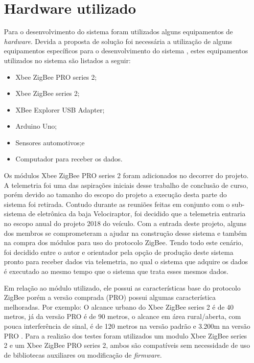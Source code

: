 \section{Hardware utilizado}
\label{sec:hardwareutilizado}

Para o desenvolvimento do sistema foram utilizados alguns equipamentos de \textit{hardware}. Devida a proposta de solução foi necessária a utilização de alguns equipamentos específicos para o desenvolvimento do sistema , estes equipamentos utilizados no sistema são listados a seguir:

\begin{itemize}
	\item Xbee ZigBee PRO series 2;
	\item Xbee ZigBee series 2;
	\item XBee Explorer USB Adapter;
	\item Arduino Uno;
	\item Sensores automotivos;e
	\item Computador para receber os dados. 
\end{itemize}  

Os módulos Xbee ZigBee PRO series 2 foram adicionados no decorrer do projeto. A telemetria foi uma das aspirações iniciais desse trabalho de conclusão de curso, porém devido ao tamanho do escopo do projeto a execução desta parte do sistema foi retirada. Contudo durante as reuniões feitas em conjunto com o sub-sistema de eletrônica da baja Velociraptor, foi decidido que a telemetria entraria no escopo anual do projeto 2018 do veículo. Com a entrada deste projeto, alguns dos membros se comprometeram a ajudar na construção desse sistema e também na compra dos módulos para uso do protocolo ZigBee. Tendo todo este cenário, foi decidido entre o autor e orientador pela opção de produção deste sistema pronto para receber dados via telemetria, no qual o sistema que adquire os dados é executado ao mesmo tempo que o sistema que trata esses mesmos dados. 

Em relação ao módulo utilizado, ele possui as características base do protocolo ZigBee porém a versão comprada (PRO) possui algumas característica melhoradas. Por exemplo: O alcance urbano do Xbee ZigBee series 2 é de 40 metros, já da versão PRO é de 90 metros, o alcance em área rural/aberta, com pouca interferência de sinal, é de 120 metros na versão padrão e 3.200m na versão PRO \cite{xbeespecs}. Para a realizão dos testes foram utilizados um modulo Xbee ZigBee series 2 e um Xbee ZigBee PRO series 2, ambos são compatíveis sem necessidade de uso de bibliotecas auxiliares ou modificação de \textit{firmware}.

